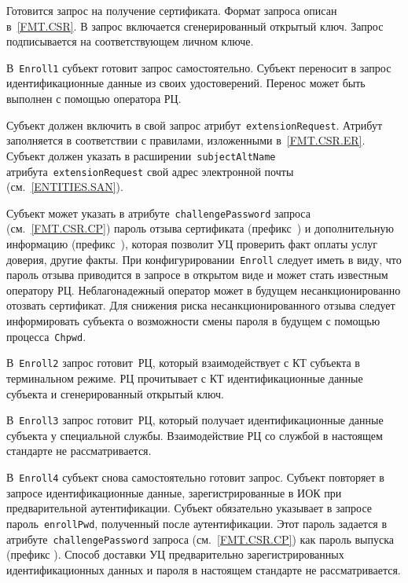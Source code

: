 Готовится запрос на получение сертификата. Формат запроса описан
в~\ref{FMT.CSR}. В запрос включается сгенерированный открытый ключ. 
Запрос подписывается на соответствующем личном ключе.

В~\texttt{Enroll1} субъект готовит запрос самостоятельно.
Субъект переносит в запрос идентификационные данные из своих 
удостоверений. Перенос может быть выполнен с помощью оператора РЦ.

Субъект должен включить в свой запрос атрибут~\texttt{extensionRequest}.
Атрибут заполняется в соответствии с правилами, изложенными 
в~\ref{FMT.CSR.ER}. Субъект должен указать в  
расширении~\texttt{subjectAltName} атрибута~\texttt{extensionRequest} 
свой адрес электронной почты (см.~\ref{ENTITIES.SAN}).

Субъект может указать в атрибуте~\texttt{challengePassword} запроса 
(см.~\ref{FMT.CSR.CP}) пароль отзыва сертификата (префикс~)
и дополнительную информацию (префикс~), которая позволит УЦ 
проверить факт оплаты услуг доверия, другие факты.
%
При конфигурировании~\texttt{Enroll} следует иметь в виду, что пароль 
отзыва приводится в запросе в открытом виде и может стать известным 
оператору РЦ. Неблагонадежный оператор может в будущем несанкционированно 
отозвать сертификат. Для снижения риска несанкционированного отзыва 
следует информировать субъекта о возможности смены пароля в будущем с помощью 
процесса~\texttt{Chpwd}.

В~\texttt{Enroll2} запрос готовит~РЦ, который взаимодействует с КТ 
субъекта в терминальном режиме. РЦ прочитывает с КТ идентификационные 
данные субъекта и сгенерированный открытый ключ.

В~\texttt{Enroll3} запрос готовит~РЦ, который получает идентификационные 
данные субъекта у специальной службы. Взаимодействие РЦ со службой в 
настоящем стандарте не рассматривается.


В~\texttt{Enroll4} субъект снова самостоятельно готовит запрос.
Субъект повторяет в запросе идентификационные данные, 
зарегистрированные в ИОК при предварительной аутентификации. 
%
Субъект обязательно указывает в запросе пароль~\texttt{enrollPwd}, 
полученный после аутентификации. Этот пароль задается в 
атрибуте~\texttt{challengePassword} запроса 
(см.~\ref{FMT.CSR.CP}) как пароль выпуска (префикс ).
%
Способ доставки УЦ предварительно зарегистрированных 
идентификационных данных и пароля в настоящем стандарте 
не рассматривается.

